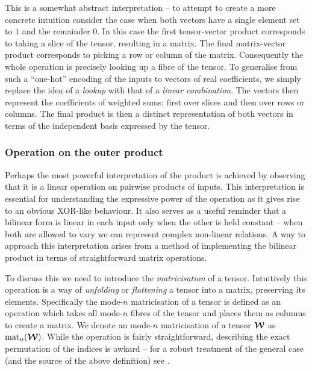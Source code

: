 This is a somewhat abstract interpretation -- to attempt to create a more concrete
 intuition
consider the case when both vectors have a single element set to \(1\) and the remainder
\(0\). In this case the first tensor-vector product corresponds to taking a slice of the
tensor, resulting in a matrix. The final matrix-vector product corresponds to picking a
row or column of the matrix. Consequently the whole operation is precisely looking up
a fibre of the tensor. To generalise from such a ``one-hot'' encoding of the inputs
to vectors of real coefficients, we simply replace the idea of a
\emph{lookup} with that of a \emph{linear combination}. The vectors then represent the coefficients
of weighted sums; first over slices and then over rows or columns. The final product is then a
distinct representation of both vectors in terms of the independent basis expressed by the tensor.

\subsubsection{Operation on the outer product}
Perhaps the most powerful interpretation of the product is achieved by observing that it is
a linear operation on pairwise products of inputs.
This interpretation is essential for understanding the expressive
power of the operation as it gives rise to an obvious XOR-like behaviour. It also serves
as a useful reminder that a bilinear form is linear in each input only when the other
is held constant -- when both are allowed to vary we can represent complex non-linear
relations.
A way to approach this interpretation arises from a method of implementing the bilinear 
product in terms of straightforward matrix operations.

To discuss
this we need to introduce the \emph{matricisation} of a tensor. Intuitively this
operation is a way of \emph{unfolding} or \emph{flattening} a tensor into a matrix,
preserving its elements. Specifically the mode-\(n\)
matricisation of a tensor is defined as an operation which takes all mode-\(n\) fibres
of the tensor and places them as columns to create a matrix. We denote an mode-\(n\)
matricisation of a tensor \(\bm{\mathcal{W}}\) as \(\operatorname{mat}_n(\bm{\mathcal{W}})\). While the operation is
fairly straightforward, describing the exact permutation of the indices is awkard -- 
for a robust treatment of the general case (and the source of the above definition) see
\autocite{Kolda2009}. 

